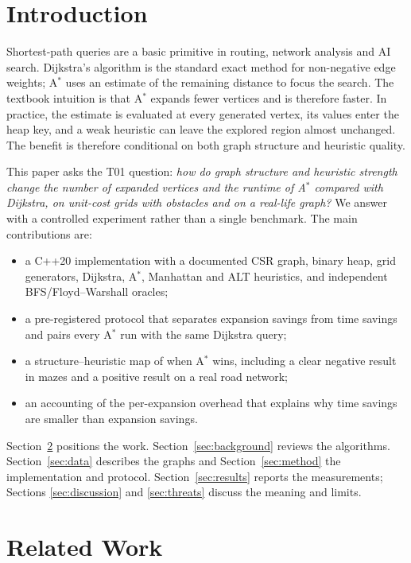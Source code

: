 \documentclass[conference,10pt]{IEEEtran}
\newcommand{\Astar}{A$^\ast$}
\begin{document}
\section{Introduction}
Shortest-path queries are a basic primitive in routing,
network analysis and AI search.  Dijkstra's algorithm \cite{dijkstra1959} is the
standard exact method for non-negative edge weights; \Astar{} \cite{hart1968}
uses an estimate of the remaining distance to focus the search.  The textbook
intuition is that \Astar{} expands fewer vertices and is therefore faster.  In
practice, the estimate is evaluated at every generated vertex, its values enter
the heap key, and a weak heuristic can leave the explored region almost
unchanged.  The benefit is therefore conditional on both graph structure and
heuristic quality.

This paper asks the T01 question: \emph{how do graph structure and heuristic
strength change the number of expanded vertices and the runtime of \Astar{}
compared with Dijkstra, on unit-cost grids with obstacles and on a real-life
graph?}  We answer with a controlled experiment rather than a single benchmark.
The main contributions are:
\begin{itemize}
  \item a C++20 implementation with a documented CSR graph, binary heap,
        grid generators, Dijkstra, \Astar{}, Manhattan and ALT heuristics, and
        independent BFS/Floyd--Warshall oracles;
  \item a pre-registered protocol that separates expansion savings from time
        savings and pairs every \Astar{} run with the same Dijkstra query;
  \item a structure--heuristic map of when \Astar{} wins, including a clear
        negative result in mazes and a positive result on a real road network;
  \item an accounting of the per-expansion overhead that explains why time
        savings are smaller than expansion savings.
\end{itemize}

Section~\ref{sec:related} positions the work.  Section~\ref{sec:background}
reviews the algorithms.  Section~\ref{sec:data}
describes the graphs and Section~\ref{sec:method} the implementation and
protocol.  Section~\ref{sec:results} reports the measurements; Sections
\ref{sec:discussion} and \ref{sec:threats} discuss the meaning and limits.

\section{Related Work}
\label{sec:related}
\end{document}

